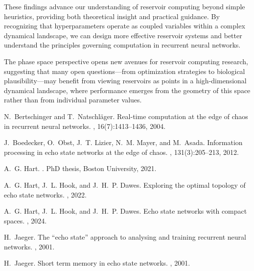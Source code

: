 \documentclass[11pt]{article}
\begin{document}
These findings advance our understanding of reservoir computing beyond simple heuristics, providing both theoretical insight and practical guidance. By recognizing that hyperparameters operate as coupled variables within a complex dynamical landscape, we can design more effective reservoir systems and better understand the principles governing computation in recurrent neural networks.

The phase space perspective opens new avenues for reservoir computing research, suggesting that many open questions—from optimization strategies to biological plausibility—may benefit from viewing reservoirs as points in a high-dimensional dynamical landscape, where performance emerges from the geometry of this space rather than from individual parameter values.


\begin{thebibliography}{10}

N.~Bertschinger and T.~Natschläger.
\newblock Real-time computation at the edge of chaos in recurrent neural networks.
, 16(7):1413--1436, 2004.

J.~Boedecker, O.~Obst, J.~T. Lizier, N.~M. Mayer, and M.~Asada.
\newblock Information processing in echo state networks at the edge of chaos.
, 131(3):205--213, 2012.

A.~G. Hart.
.
\newblock PhD thesis, Boston University, 2021.

A.~G. Hart, J.~L. Hook, and J.~H.~P. Dawes.
\newblock Exploring the optimal topology of echo state networks.
, 2022.

A.~G. Hart, J.~L. Hook, and J.~H.~P. Dawes.
\newblock Echo state networks with compact spaces.
, 2024.

H.~Jaeger.
\newblock The ``echo state'' approach to analysing and training recurrent neural networks.
, 2001.

H.~Jaeger.
\newblock Short term memory in echo state networks.
, 2001.


\end{thebibliography}
\end{document}
